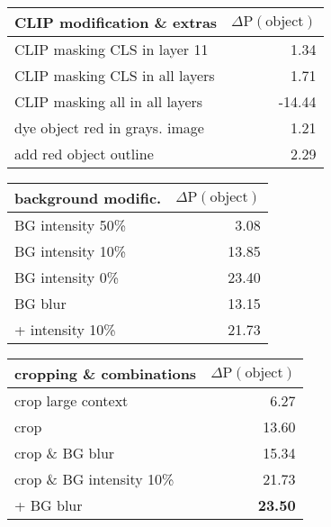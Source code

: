 \begin{table*}
    \centering
    \footnotesize
    \begin{tabular}{lr}
        \toprule
         CLIP modification \& extras & $\Delta \text{P}(\text{object})$ \\
         \midrule
CLIP masking CLS in layer 11 & 1.34 \\
CLIP masking CLS in all layers & 1.71 \\
CLIP masking all in all layers & -14.44 \\
dye object red in grays. image & 1.21 \\
add red object outline & 2.29 \\
         \bottomrule
    \end{tabular}
    \hspace{0.5cm}
    \begin{tabular}{lr}
        \toprule
        background modific. & $\Delta \text{P}(\text{object})$ \\
         \midrule
BG intensity 50\% & 3.08 \\
BG intensity 10\% & 13.85 \\
BG intensity 0\% & 23.40 \\
BG blur & 13.15 \\
+ intensity 10\% & 21.73 \\
         \bottomrule
    \end{tabular} 
    \hspace{0.5cm}
    \begin{tabular}{lr}
        \toprule
         cropping \& combinations & $\Delta \text{P}(\text{object})$ \\
         \midrule
crop large context & 6.27 \\
crop & 13.60 \\
crop \& BG blur & 15.34 \\
crop \& BG intensity 10\% & 21.73 \\
+ BG blur & \textbf{23.50} \\
         \bottomrule
    \end{tabular}        
    \caption{Visual prompt engineering: Average improvement of object probability for different forms of combining image and mask over 1,600 samples. Cropping means cutting the image according to the regions specified by the mask, ``BG'' means background.}
    \label{tab:prompt_engineering_short}
\end{table*}

